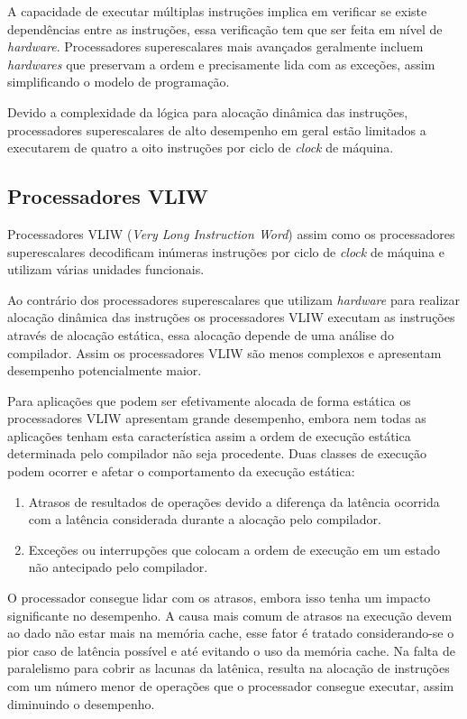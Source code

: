 A capacidade de executar múltiplas instruções implica em verificar se existe
dependências entre as instruções, essa verificação tem que ser feita em nível de
\textit{hardware}. 
Processadores superescalares mais avançados geralmente incluem 
\textit{hardwares} que preservam a ordem e precisamente lida com as exceções, 
assim simplificando o modelo de programação.

Devido a complexidade da lógica para alocação dinâmica das instruções,
processadores superescalares de alto desempenho em geral estão limitados a
executarem de quatro a oito instruções por ciclo de \textit{clock} de máquina.


\subsection{Processadores VLIW}

Processadores VLIW (\textit{Very Long Instruction Word}) assim como os
processadores superescalares decodificam inúmeras instruções por ciclo de
\textit{clock} de máquina e utilizam várias unidades funcionais.

Ao contrário dos processadores superescalares que utilizam \textit{hardware}
para realizar alocação dinâmica das instruções os processadores VLIW executam as 
instruções através de alocação estática, essa alocação depende de uma análise do
compilador.
Assim os processadores VLIW são menos complexos e apresentam desempenho 
potencialmente maior.

Para aplicações que podem ser efetivamente alocada de forma estática os
processadores VLIW apresentam grande desempenho, embora nem todas as aplicações
tenham esta característica assim a ordem de execução estática determinada pelo
compilador não seja procedente. 
Duas classes de execução podem ocorrer e afetar o comportamento da execução 
estática:

\begin{enumerate}
        \item Atrasos de resultados de operações devido a diferença da latência
                ocorrida com a latência considerada durante a alocação pelo
                compilador.
        \item Exceções ou interrupções que colocam a ordem de execução em um
                estado não antecipado pelo compilador.
\end{enumerate}

O processador consegue lidar com os atrasos, embora isso tenha um impacto 
significante no desempenho. 
A causa mais comum de atrasos na execução devem ao dado não estar mais na 
memória cache, esse fator é tratado considerando-se o pior caso de latência 
possível e até evitando o uso da memória cache. 
Na falta de paralelismo para cobrir as lacunas da latênica, resulta na 
alocação de instruções com um número menor de operações que o processador 
consegue executar, assim diminuindo o desempenho.


